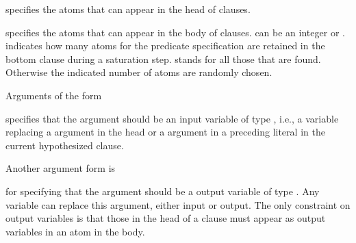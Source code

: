 \documentclass[letterpaper,10pt,english]{sphinxmanual}
\begin{document}
\sphinxAtStartPar
specifies the atoms that can appear in the head of clauses.

\begin{sphinxVerbatim}[commandchars=\\\{\}]
\end{sphinxVerbatim}

\sphinxAtStartPar
specifies the atoms that can appear in the body of clauses.  can be an integer or \sphinxcode{\sphinxupquote{*}}.  indicates how many atoms for the predicate specification are retained in the bottom clause during a saturation step. \sphinxcode{\sphinxupquote{*}} stands for all those that are found.
Otherwise the indicated number of atoms are randomly chosen.

\sphinxAtStartPar
Arguments of the form

\begin{sphinxVerbatim}[commandchars=\\\{\}]
\end{sphinxVerbatim}

\sphinxAtStartPar
specifies that the argument should be an input variable of type , i.e., a variable replacing a  argument in the head or a  argument in a preceding literal in the current hypothesized clause.

\sphinxAtStartPar
Another argument form is

\begin{sphinxVerbatim}[commandchars=\\\{\}]
\end{sphinxVerbatim}

\sphinxAtStartPar
for specifying that the argument should be a output variable of type .
Any variable can replace this argument, either input or output.
The only constraint on output variables is that those in the head of a clause must appear as output variables in an atom in the body.
\end{document}
